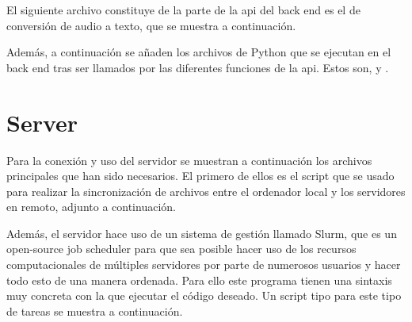 El siguiente archivo constituye de la parte de la \gls{api} del back end es el
de conversión de audio a texto, que se muestra a continuación.


Además, a continuación se añaden los archivos de Python que se ejecutan en el
back end tras ser llamados por las diferentes funciones de la \gls{api}. Estos
son,  y .





\section{Server}\label{sec:code-server}

Para la conexión y uso del servidor se muestran a continuación los archivos
principales que han sido necesarios. El primero de ellos es el script que se
usado para realizar la sincronización de archivos entre el ordenador local y
los servidores en remoto, adjunto a continuación.


Además, el servidor hace uso de un sistema de gestión llamado Slurm, que es un
open-source job scheduler para que sea posible hacer uso de los recursos
computacionales de múltiples servidores por parte de numerosos usuarios y hacer
todo esto de una manera ordenada. Para ello este programa tienen una sintaxis
muy concreta con la que ejecutar el código deseado. Un script tipo para este
tipo de tareas se muestra a continuación.

